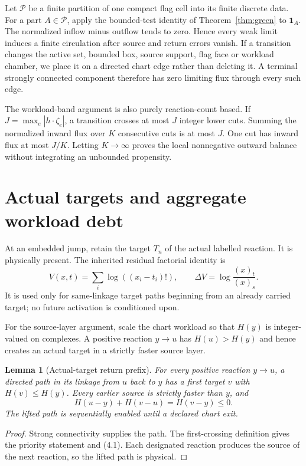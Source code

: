 \documentclass[11pt]{article}
\newtheorem{lemma}[theorem]{Lemma}
\newcommand{\one}{\mathbf 1}
\begin{document}
Let \(\mathcal P\) be a finite partition of one compact flag cell into its
finite discrete data.  For a part \(A\in\mathcal P\), apply the bounded-test
identity of Theorem~\ref{thm:green} to \(\one_A\).  The normalized inflow
minus outflow tends to zero.  Hence every weak limit induces a finite
circulation after source and return errors vanish.  If a transition changes
the active set, bounded box, source support, flag face or workload chamber,
we place it on a directed chart edge rather than deleting it.  A terminal
strongly connected component therefore has zero limiting flux through every
such edge.

The workload-band argument is also purely reaction-count based.  If
\(J=\max_e|h\cdot\zeta_e|\), a transition crosses at most \(J\) integer lower
cuts.  Summing the normalized inward flux over \(K\) consecutive cuts is at
most \(J\).  One cut has inward flux at most \(J/K\).  Letting \(K\to\infty\)
proves the local nonnegative outward balance without integrating an
unbounded propensity.

\section{Actual targets and aggregate workload debt}

At an embedded jump, retain the target \(T_n\) of the actual labelled
reaction.  It is physically present.  The inherited residual factorial
identity is
\[
 V(x,t)=\sum_i\log((x_i-t_i)!),\qquad
 \Delta V=\log\frac{(x)_t}{(x)_s}.
\]
It is used only for same-linkage target paths beginning from an already
carried target; no future activation is conditioned upon.

For the source-layer argument, scale the chart workload so that \(H(y)\) is
integer-valued on complexes.  A positive reaction \(y\to u\) has \(H(u)>H(y)\)
and hence creates an actual target in a strictly faster source layer.

\begin{lemma}[Actual-target return prefix]\label{lem:return}
For every positive reaction \(y\to u\), a directed path in its linkage from
\(u\) back to \(y\) has a first target \(v\) with \(H(v)\le H(y)\).  Every
earlier source is strictly faster than \(y\), and
\[
 H(u-y)+H(v-u)=H(v-y)\le0.                    \tag{4.1}
\]
The lifted path is sequentially enabled until a declared chart exit.
\end{lemma}

\begin{proof}
Strong connectivity supplies the path.  The first-crossing definition gives
the priority statement and (4.1).  Each designated reaction produces the
source of the next reaction, so the lifted path is physical.
\end{proof}
\end{document}

